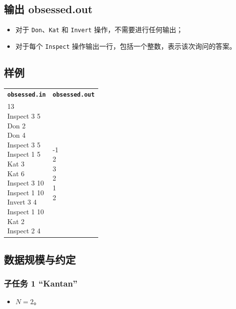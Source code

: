 \documentclass[UTF8, 11pt, a4paper]{article}
\begin{document}
\subsection*{输出 \makebox[0.5em]{} \small{obsessed.out}}
\begin{itemize}
    \item 对于 \texttt{Don}、\texttt{Kat} 和 \texttt{Invert} 操作，不需要进行任何输出；
    \item 对于每个 \texttt{Inspect} 操作输出一行，包括一个整数，表示该次询问的答案。
\end{itemize}

\subsection*{样例}
\begin{table}[h]\centering
\begin{tabularx}{0.8 \textwidth}{|X|X|}
\hline
\texttt{\textbf{obsessed.in}} & \texttt{\textbf{obsessed.out}} \\ \hline
{\ttfamily
10 13\newline
Inspect 3 5\newline
Don 2\newline
Don 4\newline
Inspect 3 5\newline
Inspect 1 5\newline
Kat 3\newline
Kat 6\newline
Inspect 3 10\newline
Inspect 1 10\newline
Invert 3 4\newline
Inspect 1 10\newline
Kat 2\newline
Inspect 2 4
} & {\ttfamily
-1\newline
-1\newline
2\newline
3\newline
2\newline
1\newline
2
}
\\ \hline
\end{tabularx}\end{table}

\subsection*{数据规模与约定}
\subsubsection*{子任务 1 “Kantan”}
\begin{itemize}
    \item $N = 2$。
\end{itemize}
\end{document}
